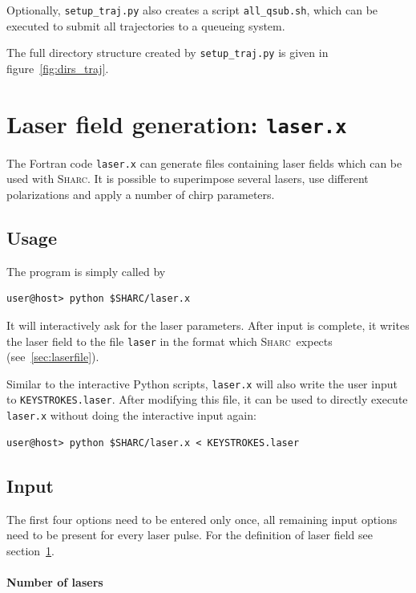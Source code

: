 \documentclass[a4paper,11pt,DIV=15,openany,twoside=false]{scrbook}
\newcommand{\sharc}{\textsc{Sharc}}
\newcommand{\ttt}[1]{\texttt{#1}}
\begin{document}
Optionally, \ttt{setup\_traj.py} also creates a script \ttt{all\_qsub.sh}, which can be executed to submit all trajectories to a queueing system.

The full directory structure created by \ttt{setup\_traj.py} is given in figure~\ref{fig:dirs_traj}.



\section{Laser field generation: \ttt{laser.x}}\label{sec:laser.x}

The Fortran code \ttt{laser.x} can generate files containing laser fields which can be used with \sharc. It is possible to superimpose several lasers, use different polarizations and apply a number of chirp parameters.

\subsection{Usage}

The program is simply called by 
\begin{verbatim}
user@host> python $SHARC/laser.x
\end{verbatim}
It will interactively ask for the laser parameters. After input is complete, it writes the laser field to the file \ttt{laser} in the format which \sharc\ expects (see~\ref{sec:laserfile}).

Similar to the interactive Python scripts, \ttt{laser.x} will also write the user input to \ttt{KEYSTROKES.laser}. After modifying this file, it can be used to directly execute \ttt{laser.x} without doing the interactive input again:
\begin{verbatim}
user@host> python $SHARC/laser.x < KEYSTROKES.laser
\end{verbatim}

\subsection{Input}

The first four options need to be entered only once, all remaining input options need to be present for every laser pulse. For the definition of laser field see section~\ref{sec:laser.x}.

\paragraph{Number of lasers}
\end{document}
